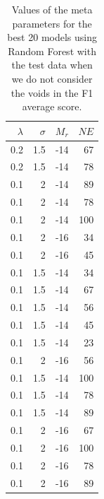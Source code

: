 \documentclass[usenatbib]{mnras}
\begin{document}
\begin{table}
\centering
\begin{tabular}{rrrr}
\hline
   $\lambda$ &   $\sigma$ &   $M_r$ &   $NE$ \\
\hline
         0.2 &        1.5 &     -14 &     67 \\
         0.2 &        1.5 &     -14 &     78 \\
         0.1 &        2   &     -14 &     89 \\
         0.1 &        2   &     -14 &     78 \\
         0.1 &        2   &     -14 &    100 \\
         0.1 &        2   &     -16 &     34 \\
         0.1 &        2   &     -16 &     45 \\
         0.1 &        1.5 &     -14 &     34 \\
         0.1 &        1.5 &     -14 &     67 \\
         0.1 &        1.5 &     -14 &     56 \\
         0.1 &        1.5 &     -14 &     45 \\
         0.1 &        1.5 &     -14 &     23 \\
         0.1 &        2   &     -16 &     56 \\
         0.1 &        1.5 &     -14 &    100 \\
         0.1 &        1.5 &     -14 &     78 \\
         0.1 &        1.5 &     -14 &     89 \\
         0.1 &        2   &     -16 &     67 \\
         0.1 &        2   &     -16 &    100 \\
         0.1 &        2   &     -16 &     78 \\
         0.1 &        2   &     -16 &     89 \\
\hline
\end{tabular}
\caption{Values of the meta parameters for the best 20 models using Random Forest with the test data when we do not consider the voids in the F1 average score.}
\label{tab:metaparameters}
\end{table}
\end{document}
